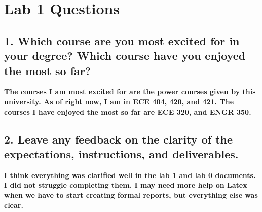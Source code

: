 \documentclass[11pt]{article}
\begin{document}
\section{Lab 1 Questions}
\subsection{1. Which course are you most excited for in your degree? Which course have you enjoyed the most so far?}
\textbf{The courses I am most excited for are the power courses given by this university. As of right now, I am in ECE 404, 420, and 421. The courses I have enjoyed the most so far are ECE 320, and ENGR 350.}
\subsection{2. Leave any feedback on the clarity of the expectations, instructions, and deliverables.}
\textbf{I think everything was clarified well in the lab 1 and lab 0 documents. I did not struggle completing them. I may need more help on Latex when we have to start creating formal reports, but everything else was clear.}
\end{document}
